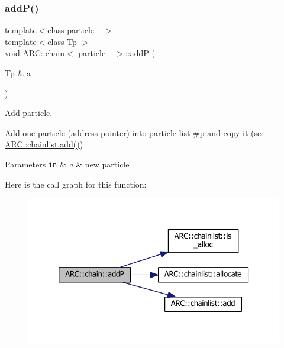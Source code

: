 \subsubsection{\texorpdfstring{add\+P()}{addP()}\hspace{0.1cm}{\footnotesize\ttfamily [1/2]}}
{\footnotesize\ttfamily template$<$class particle\+\_\+ $>$ \\
template$<$class Tp $>$ \\
void \hyperlink{classARC_1_1chain}{A\+R\+C\+::chain}$<$ particle\+\_\+ $>$\+::addP (\begin{DoxyParamCaption}\item[{Tp \&}]{a }\end{DoxyParamCaption})\hspace{0.3cm}{\ttfamily [inline]}}



Add particle. 

Add one particle (address pointer) into particle list \#p and copy it (see \hyperlink{classARC_1_1chainlist_a598c1819d8e715ec0a24669e5bb06c6a}{A\+R\+C\+::chainlist.\+add()}) 
\begin{DoxyParams}[1]{Parameters}
\mbox{\tt in}  & {\em a} & new particle \\
\hline
\end{DoxyParams}
Here is the call graph for this function\+:
\nopagebreak
\begin{figure}[H]
\begin{center}
\leavevmode
\includegraphics[width=326pt]{classARC_1_1chain_a2df655cb46fcb7e892f196340e7d5c83_cgraph}
\end{center}
\end{figure}
\hypertarget{classARC_1_1chain_aa89210cc0dd376c75e6acc30d2db740e}{}\label{classARC_1_1chain_aa89210cc0dd376c75e6acc30d2db740e} 
